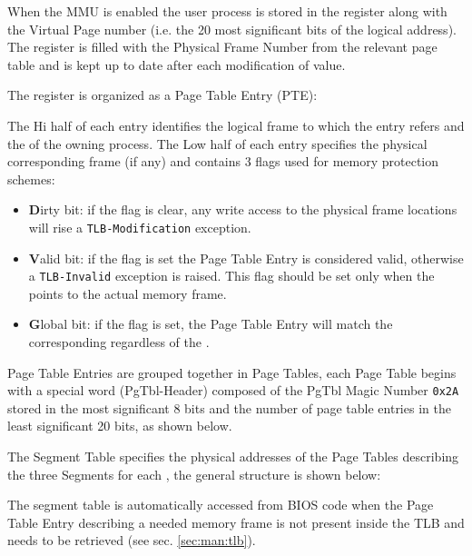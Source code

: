 When the MMU is enabled the user process  is stored in the  register along with the Virtual Page number (i.e. the 20 most significant bits of the logical address). The  register is filled with the Physical Frame Number from the relevant page table and is kept up to date after each modification of  value.

\label{sec:man:pageTable}
The  register is organized as a Page Table Entry (PTE):

\label{sec:man:pageTableEntry}

The Hi half of each entry identifies the logical frame to which the entry refers and the  of the owning process.
The Low half of each entry specifies the physical corresponding frame (if any) and contains 3 flags used for memory protection schemes:
\begin{itemize}
	\item \textbf{D}irty bit: if the flag is clear, any write access to the physical frame locations will rise a \texttt{TLB-Modification} exception.
\item \textbf{V}alid bit: if the flag is set the Page Table Entry is considered valid, otherwise a \texttt{TLB-Invalid} exception is raised.
	This flag should be set only when the  points to the actual memory frame.
\item \textbf{G}lobal bit: if the flag is set, the Page Table Entry will match the corresponding  regardless of the .
\end{itemize}

Page Table Entries are grouped together in Page Tables, each Page Table begins with a special word (PgTbl-Header) composed of the PgTbl Magic Number \texttt{0x2A} stored in the most significant 8 bits and the number of page table entries in the least significant 20 bits, as shown below.



\label{sec:man:segmentTable}
The Segment Table specifies the physical addresses of the Page Tables describing the three Segments for each , the general structure is shown below:


The segment table is automatically accessed from BIOS code when the Page Table Entry describing a needed memory frame is not present inside the TLB and needs to be retrieved (see sec. \ref{sec:man:tlb}).

